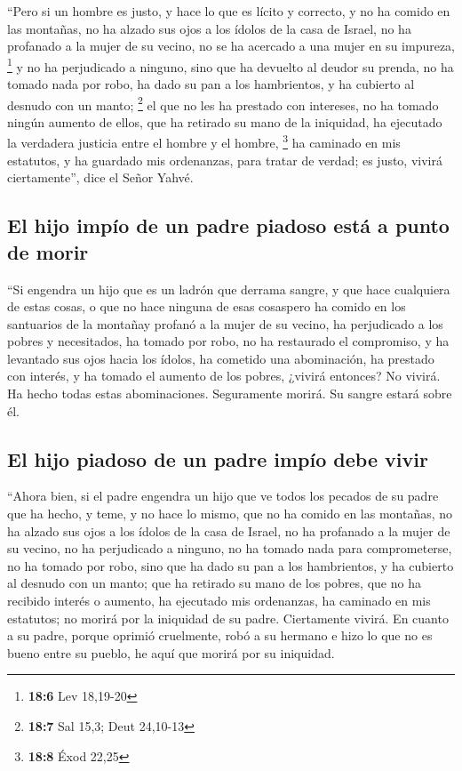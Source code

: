  ``Pero si un hombre es justo, y hace lo que es lícito y
correcto,  y no ha comido en las montañas, no ha alzado
sus ojos a los ídolos de la casa de Israel, no ha profanado a la mujer
de su vecino, no se ha acercado a una mujer en su impureza, \footnote{\textbf{18:6}
  Lev 18,19-20}  y no ha perjudicado a ninguno, sino que
ha devuelto al deudor su prenda, no ha tomado nada por robo, ha dado su
pan a los hambrientos, y ha cubierto al desnudo con un manto;
\footnote{\textbf{18:7} Sal 15,3; Deut 24,10-13}  el que
no les ha prestado con intereses, no ha tomado ningún aumento de ellos,
que ha retirado su mano de la iniquidad, ha ejecutado la verdadera
justicia entre el hombre y el hombre, \footnote{\textbf{18:8} Éxod 22,25}
 ha caminado en mis estatutos, y ha guardado mis
ordenanzas, para tratar de verdad; es justo, vivirá ciertamente'', dice
el Señor Yahvé.

\hypertarget{el-hijo-impuxedo-de-un-padre-piadoso-estuxe1-a-punto-de-morir}{%
\subsection{El hijo impío de un padre piadoso está a punto de
morir}\label{el-hijo-impuxedo-de-un-padre-piadoso-estuxe1-a-punto-de-morir}}

 ``Si engendra un hijo que es un ladrón que derrama
sangre, y que hace cualquiera de estas cosas,  o que no
hace ninguna de esas cosaspero ha comido en los santuarios de la
montañay profanó a la mujer de su vecino,  ha perjudicado
a los pobres y necesitados, ha tomado por robo, no ha restaurado el
compromiso, y ha levantado sus ojos hacia los ídolos, ha cometido una
abominación,  ha prestado con interés, y ha tomado el
aumento de los pobres, ¿vivirá entonces? No vivirá. Ha hecho todas estas
abominaciones. Seguramente morirá. Su sangre estará sobre él.

\hypertarget{el-hijo-piadoso-de-un-padre-impuxedo-debe-vivir}{%
\subsection{El hijo piadoso de un padre impío debe
vivir}\label{el-hijo-piadoso-de-un-padre-impuxedo-debe-vivir}}

 ``Ahora bien, si el padre engendra un hijo que ve todos
los pecados de su padre que ha hecho, y teme, y no hace lo mismo,
 que no ha comido en las montañas, no ha alzado sus ojos
a los ídolos de la casa de Israel, no ha profanado a la mujer de su
vecino,  no ha perjudicado a ninguno, no ha tomado nada
para comprometerse, no ha tomado por robo, sino que ha dado su pan a los
hambrientos, y ha cubierto al desnudo con un manto;  que
ha retirado su mano de los pobres, que no ha recibido interés o aumento,
ha ejecutado mis ordenanzas, ha caminado en mis estatutos; no morirá por
la iniquidad de su padre. Ciertamente vivirá.  En cuanto
a su padre, porque oprimió cruelmente, robó a su hermano e hizo lo que
no es bueno entre su pueblo, he aquí que morirá por su iniquidad.

